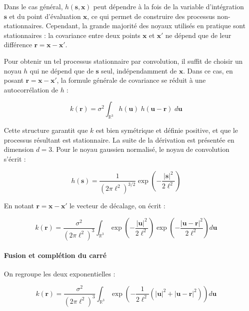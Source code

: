 Dans le cas général, $h(\mathbf{s}, \mathbf{x})$ peut dépendre à la fois de la variable d'intégration $\mathbf{s}$ et du point d'évaluation $\mathbf{x}$, ce qui permet de construire des processus non-stationnaires. Cependant, la grande majorité des noyaux utilisés en pratique sont stationnaires : la covariance entre deux points $\mathbf{x}$ et $\mathbf{x}'$ ne dépend que de leur différence $\mathbf{r} = \mathbf{x} - \mathbf{x}'$.

Pour obtenir un tel processus stationnaire par convolution, il suffit de choisir un noyau $h$ qui ne dépend que de $\mathbf{s}$ seul, indépendamment de $\mathbf{x}$. Dans ce cas, en posant $\mathbf{r} = \mathbf{x} - \mathbf{x}'$, la formule générale de covariance se réduit à une autocorrélation de $h$ :

\begin{equation}
k(\mathbf{r}) = \sigma^2 \int_{\mathbb{R}^3} h(\mathbf{u})\; h(\mathbf{u} - \mathbf{r})\; d\mathbf{u}
\end{equation}

Cette structure garantit que $k$ est bien symétrique et définie positive, et que le processus résultant est stationnaire. La suite de la dérivation est présentée en dimension $d = 3$. Pour le noyau gaussien normalisé, le noyau de convolution s'écrit :

\begin{equation}
h(\mathbf{s}) = \frac{1}{(2\pi\ell^2)^{3/2}} \exp\!\left(-\frac{|\mathbf{s}|^2}{2\ell^2}\right)
\end{equation}

En notant $\mathbf{r} = \mathbf{x} - \mathbf{x}'$ le vecteur de décalage, on écrit :

\begin{equation}
k(\mathbf{r}) = \frac{\sigma^2}{(2\pi\ell^2)^{3}} \int_{\mathbb{R}^3} \exp\!\left(-\frac{|\mathbf{u}|^2}{2\ell^2}\right) \exp\!\left(-\frac{|\mathbf{u} - \mathbf{r}|^2}{2\ell^2}\right) d\mathbf{u}
\end{equation}

\paragraph{Fusion et complétion du carré}

On regroupe les deux exponentielles :

\begin{equation}
k(\mathbf{r}) = \frac{\sigma^2}{(2\pi\ell^2)^{3}} \int_{\mathbb{R}^3} \exp\!\left(-\frac{1}{2\ell^2}\left(|\mathbf{u}|^2 + |\mathbf{u} - \mathbf{r}|^2\right)\right) d\mathbf{u}
\end{equation}

